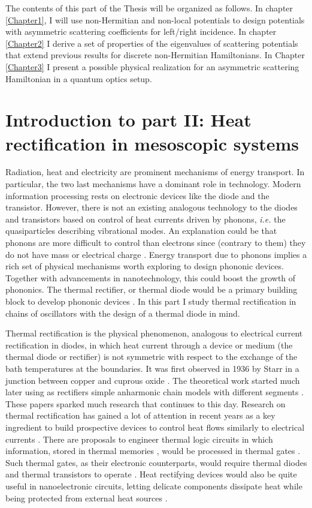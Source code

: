 The contents of this part of the Thesis will be organized as follows. In chapter \ref{Chapter1}, I will use non-Hermitian and non-local potentials to design potentials with asymmetric scattering coefficients for left/right incidence. In chapter \ref{Chapter2} I derive a set of properties of the eigenvalues of scattering potentials that extend previous results for discrete non-Hermitian Hamiltonians. In Chapter \ref{Chapter3} I present a possible physical realization for an asymmetric scattering Hamiltonian in a quantum optics setup.


\section*{Introduction to part II: Heat rectification in mesoscopic systems}

Radiation, heat and electricity are prominent mechanisms of energy transport. In particular, the two last mechanisms have a dominant role in technology. Modern information processing rests on electronic devices like the diode and the transistor. However, there is not an existing analogous technology to the diodes and transistors based on control of heat currents driven by phonons, \textit{i.e.} the quasiparticles describing vibrational modes. An explanation could be that phonons are more difficult to control than electrons since (contrary to them) they do not have mass or electrical charge \cite{Li2012}. Energy transport due to phonons implies a rich set of physical mechanisms worth exploring to design phononic devices. Together with advancements in nanotechnology, this could boost the growth of phononics. The thermal rectifier, or thermal diode would be a primary building block to develop phononic devices \cite{Li2012}. In this part I study thermal rectification in chains of oscillators with the design of a thermal diode in mind.

Thermal rectification is the physical phenomenon, analogous to electrical current rectification in diodes, in which heat current through a device or medium (the thermal diode or rectifier) is not symmetric with respect to the exchange of the bath temperatures at the boundaries. It was  first observed in 1936 by Starr in a junction between copper and cuprous oxide \cite{Starr1936}. The theoretical work started much later using as rectifiers simple anharmonic chain models
with different segments \cite{Terraneo2002,Li2004}. These papers sparked much research that continues to this day. Research on thermal rectification has gained a lot of attention in recent years as a key ingredient to build prospective devices to control heat flows similarly to electrical currents \cite{Roberts2011,Li2012}. There are  proposals to engineer thermal logic circuits \cite{Ye2017} in which information, stored in thermal memories \cite{Wang2008}, would be processed in thermal gates \cite{Wang2007}. Such thermal gates, as their electronic counterparts,  would require thermal diodes and thermal transistors to operate \cite{Li2006,Joulain2016}.
Heat rectifying devices would also be quite useful in nanoelectronic circuits, letting delicate components dissipate heat while being protected from external heat sources \cite{Roberts2011}.

